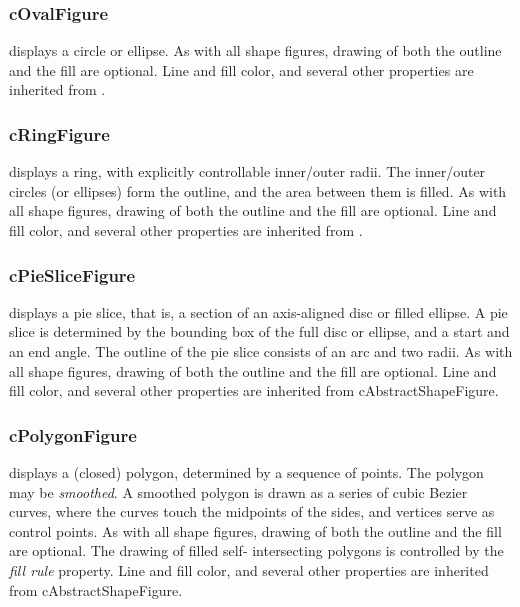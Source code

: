 \subsubsection{cOvalFigure}

 displays a circle or ellipse. As with all shape figures, drawing
of both the outline and the fill are optional. Line and fill color, and
several other properties are inherited from .

\subsubsection{cRingFigure}

 displays a ring, with explicitly controllable
inner/outer radii. The inner/outer circles (or ellipses) form the outline,
and the area between them is filled. As with all shape figures, drawing of
both the outline and the fill are optional. Line and fill color, and
several other properties are inherited from .

\subsubsection{cPieSliceFigure}

 displays a pie slice, that is, a section of an
axis-aligned disc or filled ellipse. A pie slice is determined by the
bounding box of the full disc or ellipse, and a start and an end angle. The
outline of the pie slice consists of an arc and two radii. As with all
shape figures, drawing of both the outline and the fill are optional. Line
and fill color, and several other properties are inherited from
cAbstractShapeFigure.

\subsubsection{cPolygonFigure}

 displays a (closed) polygon, determined by a sequence of points.
The polygon may be \textit{smoothed}. A smoothed polygon is drawn as a series
of cubic Bezier curves, where the curves touch the midpoints of the sides,
and vertices serve as control points. As with all shape figures, drawing of
both the outline and the fill are optional. The drawing of filled self-
intersecting polygons is controlled by the \textit{fill rule} property.
Line and fill color, and several other properties are inherited from
cAbstractShapeFigure.

